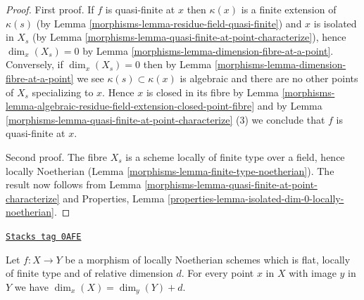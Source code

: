 \begin{proof}

First proof.
If $f$ is quasi-finite at $x$ then $\kappa(x)$ is a finite extension of
$\kappa(s)$ (by
Lemma \ref{morphisms-lemma-residue-field-quasi-finite})
and $x$ is isolated in $X_s$ (by
Lemma \ref{morphisms-lemma-quasi-finite-at-point-characterize}),
hence $\dim_x(X_s) = 0$ by
Lemma \ref{morphisms-lemma-dimension-fibre-at-a-point}.
Conversely, if $\dim_x(X_s) = 0$ then by
Lemma \ref{morphisms-lemma-dimension-fibre-at-a-point}
we see $\kappa(s) \subset \kappa(x)$ is algebraic and
there are no other points of $X_s$ specializing to $x$.
Hence $x$ is closed in its fibre by
Lemma \ref{morphisms-lemma-algebraic-residue-field-extension-closed-point-fibre}
and by
Lemma \ref{morphisms-lemma-quasi-finite-at-point-characterize} (3)
we conclude that $f$ is quasi-finite at $x$.

\medskip\noindent
Second proof. The fibre $X_s$ is a scheme locally of finite type over a field,
hence locally Noetherian (Lemma \ref{morphisms-lemma-finite-type-noetherian}).
The result now follows from
Lemma \ref{morphisms-lemma-quasi-finite-at-point-characterize}
and Properties, Lemma \ref{properties-lemma-isolated-dim-0-locally-noetherian}.
\end{proof}

\begin{lemma}
\label{morphisms-lemma-rel-dimension-dimension}
\href{https://stacks.math.columbia.edu/tag/0AFE}{\texttt{Stacks tag 0AFE}}

Let $f : X \to Y$ be a morphism of locally Noetherian schemes
which is flat, locally of finite type and of relative dimension $d$.
For every point $x$ in $X$ with image
$y$ in $Y$ we have $\dim_x(X) = \dim_y(Y) + d$.
\end{lemma}

